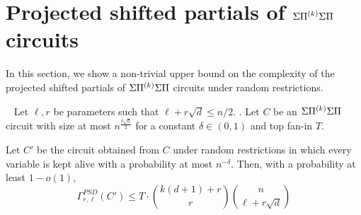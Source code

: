 \iffalse
\begin{proof}
The proof would essentially follow from the application of Corollary~\ref{cor:using algebraic independence new} to each of the summands on the right hand side. The only catch is that the transalations $\veca$ could be different for each one of them. Since we are working over infinite fields, without loss of generality, we can assume that there is a good translation $\veca$ which works for all the summands. 
\end{proof}
\fi

\section{Projected shifted partials of $\Sigma{\Pi^{(k)}}\Sigma\Pi$ circuits}

In this section, we show a non-trivial upper bound on the complexity of the projected shifted partials of $\Sigma{\Pi^{(k)}}\Sigma\Pi$ circuits under random restrictions. 
\begin{lemma}~\label{lem: circuit complexity bound}
Let $\ell, r$ be parameters such that $\ell + r\sqrt{d} \leq n/2$. . Let $C $ be an $\Sigma{\Pi^{(k)}}\Sigma\Pi$ circuit with size at most $n^{\frac{\delta \sqrt{d}}{2}}$ for a constant $\delta \in (0,1)$ and top fan-in $T$. 

Let $C'$ be the circuit obtained from $C$ under random restrictions in which every variable is kept alive with a probability at most $n^{-\delta}$. Then, with a probability at least $1-o(1)$, 
$$\Gamma_{r, \ell}^{PSD}(C') \leq T\cdot {k(d+1) + r \choose r}{n \choose \ell + r\sqrt{d}} $$
\end{lemma}
